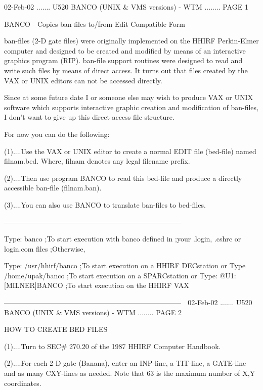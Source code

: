    02-Feb-02 ....... U520  BANCO (UNIX & VMS versions) - WTM ........ PAGE   1
 
 
 
             BANCO  - Copies ban-files to/from Edit Compatible Form
 
   ban-files  (2-D  gate  files)  were  originally  implemented  on  the HHIRF
   Perkin-Elmer computer and designed to be created and modified by  means  of
   an  interactive  graphics  program  (RIP).  ban-file  support routines were
   designed to read and write such files by means of direct access.  It  turns
   out  that  files  created  by  the  VAX or UNIX editors can not be accessed
   directly.
 
   Since at some future date I or someone else may  wish  to  produce  VAX  or
   UNIX  software which supports interactive graphic creation and modification
   of ban-files, I don't want to give up this direct access file structure.
 
   For now you can do the following:
 
   (1)....Use the VAX or UNIX editor to create a normal EDIT  file  (bed-file)
          named filnam.bed. Where, filnam denotes any legal filename prefix.
 
   (2)....Then  use program BANCO to read this bed-file and produce a directly
          accessible ban-file (filnam.ban).
 
   (3)....You can also use BANCO to translate ban-files to bed-files.
 
   ---------------------------------------------------------------------------
 
   Type:  banco              ;To start execution with banco defined in
                             ;your .login, .cshrc or login.com files
                             ;Otherwise,
 
   Type:  /usr/hhirf/banco   ;To start execution on a HHIRF DECstation
   or
   Type   /home/upak/banco   ;To start execution on a SPARCstation
   or
   Type: @U1:[MILNER]BANCO   ;To start execution on the HHIRF VAX
 
   ---------------------------------------------------------------------------
    
   02-Feb-02 ....... U520  BANCO (UNIX & VMS versions) - WTM ........ PAGE   2
 
 
                             HOW TO CREATE BED FILES
 
   (1)....Turn to SEC# 270.20 of the 1987 HHIRF Computer Handbook.
 
   (2)....For each 2-D  gate  (Banana),  enter  an  INP-line,  a  TIT-line,  a
          GATE-line  and  as  many  CXY-lines  as  needed. Note that 63 is the
          maximum number of X,Y coordinates.
 
